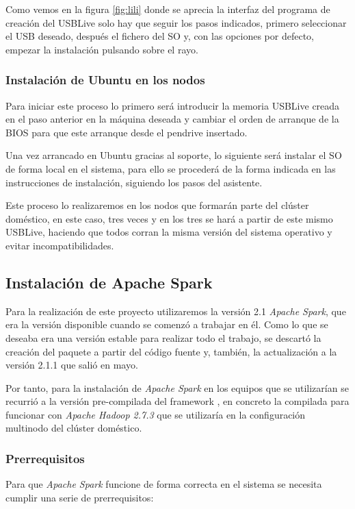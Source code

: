 Como vemos en la figura \ref{fig:lili} donde se aprecia la interfaz del programa de creación del \Gls{USBLive} solo hay que seguir los pasos indicados, primero seleccionar el USB deseado, después el fichero del \gls{SO} y, con las opciones por defecto, empezar la instalación pulsando sobre el rayo.

\subsubsection{Instalación de Ubuntu en los nodos}
Para iniciar este proceso lo primero será introducir la memoria \Gls{USBLive} creada en el paso anterior en la máquina deseada y cambiar el orden de arranque de la \gls{BIOS} para que este arranque desde el pendrive insertado.

Una vez arrancado en Ubuntu gracias al soporte, lo siguiente será instalar el \gls{SO} de forma local en el sistema, para ello se procederá de la forma indicada en las instrucciones de instalación, siguiendo los pasos del asistente.

Este proceso lo realizaremos en los nodos que formarán parte del clúster doméstico, en este caso, tres veces y en los tres se hará a partir de este mismo \gls{USBLive}, haciendo que todos corran la misma versión del sistema operativo y evitar incompatibilidades.

\subsection{Instalación de Apache Spark}
Para la realización de este proyecto utilizaremos la versión 2.1 \textit{Apache Spark}, que era la versión disponible cuando se comenzó a trabajar en él. Como lo que se deseaba era una versión estable para realizar todo el trabajo, se descartó la creación del paquete a partir del código fuente y, también, la actualización a la versión 2.1.1 que salió en mayo. 

Por tanto, para la instalación de \textit{Apache Spark} en los equipos que se utilizarían se recurrió a la versión pre-compilada del \Gls{framework}  \cite{descargaSpark}, en concreto la compilada para funcionar con \textit{Apache Hadoop 2.7.3} que se utilizaría en la configuración multinodo del clúster doméstico.

\subsubsection{Prerrequisitos}
Para que \textit{Apache Spark} funcione de forma correcta en el sistema se necesita cumplir una serie de prerrequisitos:

